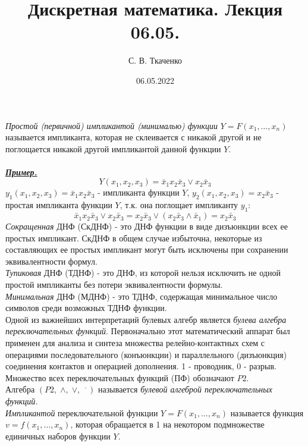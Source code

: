 \documentclass{article}
\title{Дискретная математика. Лекция 06.05.}
\author{С. В. Ткаченко}
\date{06.05.2022}
\begin{document}
	\maketitle
	\textit{Простой (первичной) импликантой (минималью) функции}
	$Y = F(x_1, \dots, x_n)$  называется импликанта, которая не склеивается с
	никакой другой и не поглощается никакой другой импликантой данной функции $Y$.
	\\\\
	\textit{\textbf{\underline{Пример.}}}
	$$Y(x_1, x_2, x_3)= \bar{x}_1 x_2 \bar{x}_3 \vee x_2 \bar{x}_3$$
	$y_1 (x_1, x_2, x_3) = \bar{x}_1 x_2 \bar{x}_3$ - импликанта функции $Y$,
	$y_2 (x_1, x_2, x_3) = x_2 \bar{x}_3$ - простая импликанта функции $Y$, т.к.
	она поглощает импликанту $y_1$:
	$$\bar{x}_1 x_2 \bar{x}_3 \vee x_2 \bar{x}_3 = x_2 \bar{x}_3 \vee (x_2 \bar{x}_3 \wedge \bar{x}_1)
	= x_2 \bar{x}_3$$
	\textit{Сокращенная} ДНФ (СкДНФ) - это ДНФ функции в виде дизъюнкции всех ее простых импликант.
	СкДНФ в общем случае избыточна, некоторые из составляющих ее простых импликант могут быть
	исключены при сохранении эквивалентности формул.\\
	
	\textit{Тупиковая} ДНФ (ТДНФ) - это ДНФ, из которой нельзя исключить не одной простой
	импликанты без потери эквивалентности формулы.\\
	
	\textit{Минимальная} ДНФ (МДНФ) - это ТДНФ, содержащая минимальное число символов среди
	возможных ТДНФ функции.\\
	
	Одной из важнейших интерпретаций булевых алгебр является \textit{булева алгебра переключательных
	функций}. Первоначально этот математический аппарат был применен для анализа и синтеза
	множества релейно-контактных схем с операциями последовательного (конъюнкции) и параллельного
	(дизъюнкция) соединения контактов и операцией дополнения. 1 - проводник, 0 - разрыв.\\
	Множество всех переключательных функций (ПФ) обозначают $P2$.\\
	Алгебра $(P2, \; \wedge, \; \vee, \; \overline{\phantom{x}})$ называется \textit{булевой алгеброй
	переключательных функций.}\\
	
	\textit{Импликантой} переключательной функции $Y = F(x_1, \dots, x_n)$ называется функция
	$v = f(x_1, \dots, x_n)$, которая обращается в 1 на некотором подмножестве единичных наборов
	функции $Y$.\\
	
\end{document}
